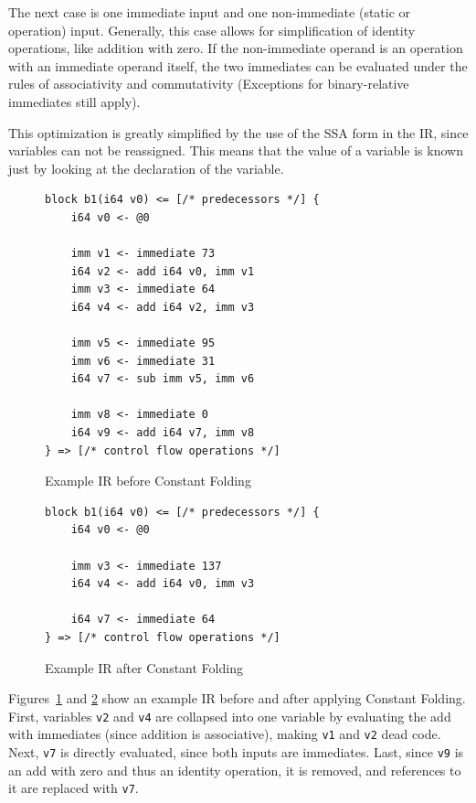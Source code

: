 \documentclass[course=eragp]{aspdoc}
\begin{document}
The next case is one immediate input and one non-immediate (static or operation) input. Generally, this case allows for
simplification of identity operations, like addition with zero. If the non-immediate operand is an operation with an
immediate operand itself, the two immediates can be evaluated under the rules of associativity and commutativity
(Exceptions for binary-relative immediates still apply).

This optimization is greatly simplified by the use of the SSA form in the IR, since variables can not be
reassigned. This means that the value of a variable is known just by looking at the declaration of the variable.

\begin{figure}[H]
    \centering
    \begin{lstlisting}[]
block b1(i64 v0) <= [/* predecessors */] {
    i64 v0 <- @0

    imm v1 <- immediate 73
    i64 v2 <- add i64 v0, imm v1
    imm v3 <- immediate 64
    i64 v4 <- add i64 v2, imm v3

    imm v5 <- immediate 95
    imm v6 <- immediate 31
    i64 v7 <- sub imm v5, imm v6

    imm v8 <- immediate 0
    i64 v9 <- add i64 v7, imm v8
} => [/* control flow operations */]
\end{lstlisting}
    \caption{Example IR before Constant Folding}\label{fig:const_folding_example_before}
\end{figure}

\begin{figure}[H]
    \centering
    \begin{lstlisting}[]
block b1(i64 v0) <= [/* predecessors */] {
    i64 v0 <- @0

    imm v3 <- immediate 137
    i64 v4 <- add i64 v0, imm v3

    i64 v7 <- immediate 64
} => [/* control flow operations */]
\end{lstlisting}
    \caption{Example IR after Constant Folding}\label{fig:const_folding_example_after}
\end{figure}

Figures~\ref{fig:const_folding_example_before} and \ref{fig:const_folding_example_after} show an example IR before and
after applying Constant Folding. First, variables \texttt{v2} and \texttt{v4} are collapsed into one variable by
evaluating the add with immediates (since addition is associative), making \texttt{v1} and \texttt{v2} dead
code. Next, \texttt{v7} is directly evaluated, since both inputs are immediates. Last, since \texttt{v9} is an add with
zero and thus an identity operation, it is removed, and references to it are replaced with \texttt{v7}.
\end{document}
